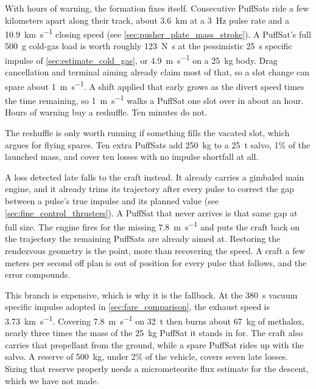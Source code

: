 \documentclass{article}
\begin{document}
With hours of warning, the formation fixes itself. Consecutive PuffSats ride a few kilometers apart along their track, about \SI{3.6}{\kilo\meter} at a \SI{3}{\hertz} pulse rate and a \SI{10.9}{\kilo\meter\per\second} closing speed (see \autoref{sec:pusher_plate_mass_stroke}). A PuffSat's full \SI{500}{\gram} cold-gas load is worth roughly \SI{123}{\newton\second} at the pessimistic \SI{25}{\second} specific impulse of \autoref{sec:estimate_cold_gas}, or \SI{4.9}{\meter\per\second} on a \SI{25}{\kilo\gram} body. Drag cancellation and terminal aiming already claim most of that, so a slot change can spare about \SI{1}{\meter\per\second}. A shift applied that early grows as the divert speed times the time remaining, so \SI{1}{\meter\per\second} walks a PuffSat one slot over in about an hour. Hours of warning buy a reshuffle. Ten minutes do not.

The reshuffle is only worth running if something fills the vacated slot, which argues for flying spares. Ten extra PuffSats add \SI{250}{\kilo\gram} to a \SI{25}{\tonne} salvo, 1\% of the launched mass, and cover ten losses with no impulse shortfall at all.

A loss detected late falls to the craft instead. It already carries a gimbaled main engine, and it already trims its trajectory after every pulse to correct the gap between a pulse's true impulse and its planned value (see \autoref{sec:fine_control_thrusters}). A PuffSat that never arrives is that same gap at full size. The engine fires for the missing \SI{7.8}{\meter\per\second} and puts the craft back on the trajectory the remaining PuffSats are already aimed at. Restoring the rendezvous geometry is the point, more than recovering the speed. A craft a few meters per second off plan is out of position for every pulse that follows, and the error compounds.

This branch is expensive, which is why it is the fallback. At the \SI{380}{\second} vacuum specific impulse adopted in \autoref{sec:fare_comparison}, the exhaust speed is \SI{3.73}{\kilo\meter\per\second}. Covering \SI{7.8}{\meter\per\second} on \SI{32}{\tonne} then burns about \SI{67}{\kilo\gram} of methalox, nearly three times the mass of the \SI{25}{\kilo\gram} PuffSat it stands in for. The craft also carries that propellant from the ground, while a spare PuffSat rides up with the salvo. A reserve of \SI{500}{\kilo\gram}, under 2\% of the vehicle, covers seven late losses. Sizing that reserve properly needs a micrometeorite flux estimate for the descent, which we have not made.
\end{document}
